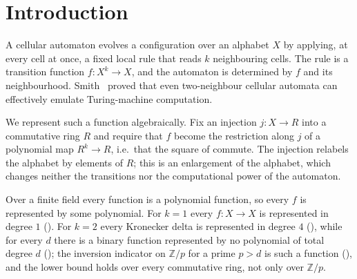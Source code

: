 
\begin{abstract}
A function $f \colon X^k \to X$ on a finite set embeds into a polynomial of total degree $d$
over a commutative ring $R$ if there is an injection $j \colon X \to R$ and a polynomial
$g$ of total degree at most $d$ with $j \circ f = g \circ j^k$, where $j^k$ applies $j$ in
each coordinate. These are the
transition functions of $k$-neighbour cellular automata, and the injection $j$ is an
enlargement of the alphabet that preserves the transitions. We prove three results, all
verified in Lean~4 with Mathlib~\cite{bacik2026finbin}. Every unary function $f \colon X \to X$ embeds into a
polynomial of total degree $1$. Every binary Kronecker delta embeds into a polynomial of
total degree $4$. For every $d$ there is a binary function that does not embed into any
polynomial of total degree $d$.
\end{abstract}

\section{Introduction}

A cellular automaton evolves a configuration over an alphabet $X$ by applying, at every
cell at once, a fixed local rule that reads $k$ neighbouring cells. The rule is a transition
function $f \colon X^k \to X$, and the automaton is determined by $f$ and its neighbourhood.
Smith~\cite{Smith1971} proved that even two-neighbour cellular automata can effectively
emulate Turing-machine computation.

We represent such a function algebraically. Fix an injection $j \colon X \to R$ into a
commutative ring $R$ and require that $f$ become the restriction along $j$ of a polynomial
map $R^k \to R$, i.e.\ that the square of  commute. The injection relabels
the alphabet by elements of $R$; this is an enlargement of the alphabet, which changes
neither the transitions nor the computational power of the automaton.

Over a finite field every function is a polynomial function, so every $f$ is represented by
some polynomial. For $k = 1$ every $f \colon X \to X$ is represented in degree $1$
(). For $k = 2$ every Kronecker delta is represented in degree $4$
(), while for every $d$ there is a binary function represented by no
polynomial of total degree $d$ (); the inversion indicator on
$\mathbb{Z}/p$ for a prime $p > d$ is such a function (), and the
lower bound holds over every commutative ring, not only over $\mathbb{Z}/p$.


